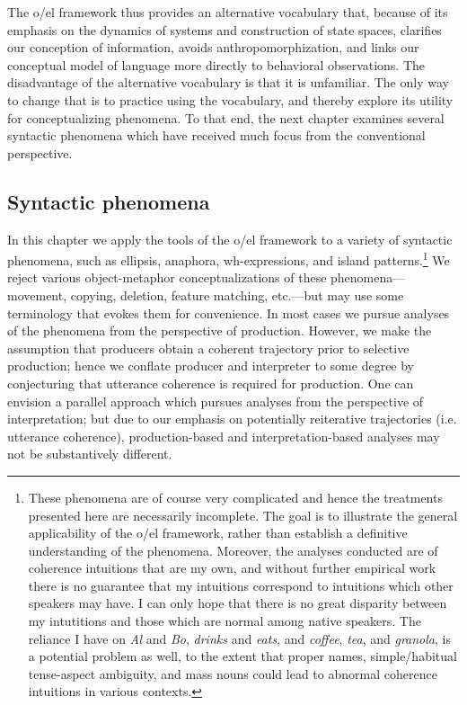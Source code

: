 The o/el framework thus provides an alternative vocabulary that, because of its emphasis on the dynamics of systems and construction of state spaces, clarifies our conception of information, avoids anthropomorphization, and links our conceptual model of language more directly to behavioral observations. The disadvantage of the alternative vocabulary is that it is unfamiliar. The only way to change that is to practice using the vocabulary, and thereby explore its utility for conceptualizing phenomena. To that end, the next chapter examines several syntactic phenomena which have received much focus from the conventional perspective.  

\subsection{Syntactic phenomena}

In this chapter we apply the tools of the o/el framework to a variety of syntactic phenomena, such as ellipsis, anaphora, wh-expressions, and island patterns.\footnote{These phenomena are of course very complicated and hence the treatments presented here are necessarily incomplete. The goal is to illustrate the general applicability of the o/el framework, rather than establish a definitive understanding of the phenomena. Moreover, the analyses conducted are of coherence intuitions that are my own, and without further empirical work there is no guarantee that my intuitions correspond to intuitions which other speakers may have. I can only hope that there is no great disparity between my intutitions and those which are normal among native speakers. The reliance I have on \textit{Al} and \textit{Bo}, \textit{drinks} and \textit{eats}, and \textit{coffee}, \textit{tea}, and \textit{granola}, is a potential problem as well, to the extent that proper names, simple/habitual tense-aspect ambiguity, and mass nouns could lead to abnormal coherence intuitions in various contexts.} We reject various object-metaphor conceptualizations of these phenomena—movement, copying, deletion, feature matching, etc.—but may use some terminology that evokes them for convenience. In most cases we pursue analyses of the phenomena from the perspective of production. However, we make the assumption that producers obtain a coherent trajectory prior to selective production; hence we conflate producer and interpreter to some degree by conjecturing that utterance coherence is required for production. One can envision a parallel approach which pursues analyses from the perspective of interpretation; but due to our emphasis on potentially reiterative trajectories (i.e. utterance coherence), production-based and interpretation-based analyses may not be substantively different. 


